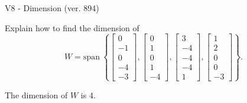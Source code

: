 \begin{exercise}
  \begin{exerciseTitle}V8 - Dimension (ver. 894)\end{exerciseTitle}
  \begin{exerciseStatement}
    Explain how to find the dimension of 
\[W=\mathrm{span}\ \left\{\left[\begin{array}{r}
0 \\
-1 \\
0 \\
-4 \\
-3
\end{array}\right] , \left[\begin{array}{r}
0 \\
1 \\
0 \\
1 \\
-4
\end{array}\right] , \left[\begin{array}{r}
3 \\
-4 \\
-4 \\
-4 \\
1
\end{array}\right] , \left[\begin{array}{r}
1 \\
2 \\
0 \\
0 \\
-3
\end{array}\right]\right\}.\]



  \end{exerciseStatement}
  \begin{exerciseAnswer}
   The dimension of \(W\) is  \(4\).
  


  \end{exerciseAnswer}
\end{exercise}